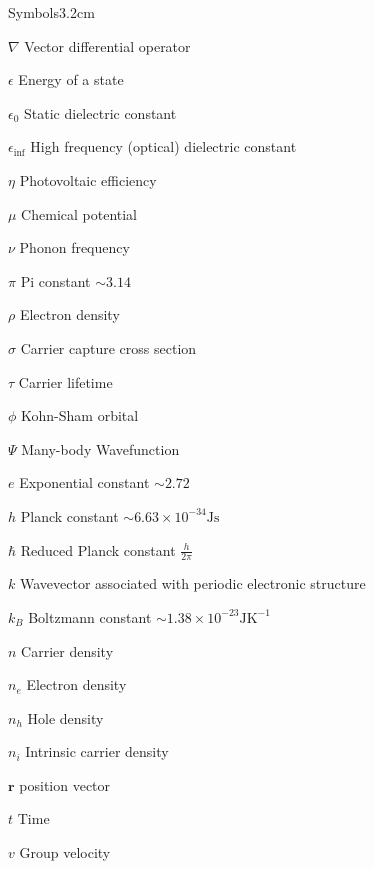 \begin{mclistof}{Symbols}{3.2cm}

\item[$\nabla$] Vector differential operator
\item[$\epsilon$] Energy of a state
\item[$\epsilon_0$] Static dielectric constant
\item[$\epsilon_{\inf}$] High frequency (optical) dielectric constant 
\item[$\eta$] Photovoltaic efficiency
\item[$\mu$] Chemical potential
\item[$\nu$] Phonon frequency
\item[$\pi$] Pi constant $\sim 3.14$
\item[$\rho$] Electron density
\item[$\sigma$] Carrier capture cross section
\item[$\tau$] Carrier lifetime
\item[$\phi$] Kohn-Sham orbital

\item[$\Psi$] Many-body Wavefunction

\vspace{\frontmatterbaselineskip}

\item[$e$] Exponential constant $\sim 2.72$
\item[$h$] Planck constant $\sim 6.63\times10^{-34}\textrm{Js}$
\item[$\hbar$] Reduced Planck constant $\frac{h}{2\pi}$ 
\item[$k$] Wavevector associated with periodic electronic structure
\item[$k_B$] Boltzmann constant $\sim 1.38\times10^{-23}\textrm{JK}^{-1}$
\item[$n$] Carrier density
\item[$n_e$] Electron density
\item[$n_h$] Hole density
\item[$n_i$] Intrinsic carrier density
\item[$\textbf{r}$] position vector
\item[$t$] Time
\item[$v$] Group velocity


\end{mclistof}
